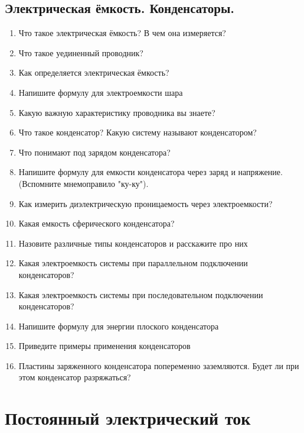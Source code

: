 \documentclass[12pt,a4paper]{report}
\begin{document}
\section{Электрическая ёмкость. Конденсаторы.}
\begin{enumerate}
\item Что такое электрическая ёмкость? В чем она измеряется?
\item Что такое уединенный проводник?
\item Как определяется электрическая ёмкость?
\item Напишите формулу для электроемкости шара
\item Какую важную характеристику проводника вы знаете?
\item Что такое конденсатор? Какую систему называют конденсатором?
\item Что понимают под зарядом конденсатора?
\item Напишите формулу для емкости конденсатора через заряд и напряжение. (Вспомните мнемоправило "ку-ку").
\item Как измерить диэлектрическую проницаемость через электроемкости?
\item Какая емкость сферического конденсатора?
\item Назовите различные типы конденсаторов и расскажите про них
\item Какая электроемкость системы при параллельном подключении конденсаторов?
\item Какая электроемкость системы при последовательном подключении конденсаторов?
\item Напишите формулу для энергии плоского конденсатора
\item Приведите примеры применения конденсаторов
\item Пластины заряженного конденсатора попеременно заземляются. Будет ли при этом конденсатор разряжаться?
\end{enumerate}

\chapter{Постоянный электрический ток}
\end{document}
